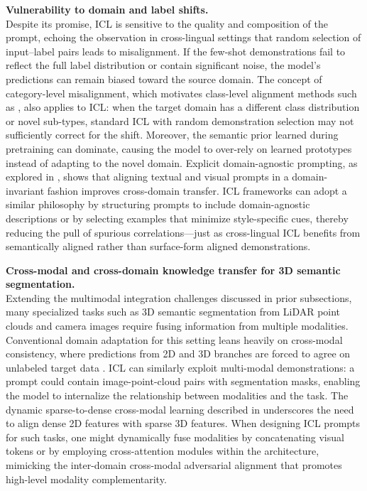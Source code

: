 \documentclass[11pt]{article}
\begin{document}
\textbf{Vulnerability to domain and label shifts.}\\
Despite its promise, ICL is sensitive to the quality and composition of the prompt, echoing the observation in cross-lingual settings that random selection of input--label pairs leads to misalignment. If the few-shot demonstrations fail to reflect the full label distribution or contain significant noise, the model's predictions can remain biased toward the source domain. The concept of category-level misalignment, which motivates class-level alignment methods such as \cite{ref138}, also applies to ICL: when the target domain has a different class distribution or novel sub-types, standard ICL with random demonstration selection may not sufficiently correct for the shift. Moreover, the semantic prior learned during pretraining can dominate, causing the model to over-rely on learned prototypes instead of adapting to the novel domain. Explicit domain-agnostic prompting, as explored in \cite{ref139}, shows that aligning textual and visual prompts in a domain-invariant fashion improves cross-domain transfer. ICL frameworks can adopt a similar philosophy by structuring prompts to include domain-agnostic descriptions or by selecting examples that minimize style-specific cues, thereby reducing the pull of spurious correlations---just as cross-lingual ICL benefits from semantically aligned rather than surface-form aligned demonstrations.

\textbf{Cross-modal and cross-domain knowledge transfer for 3D semantic segmentation.}\\
Extending the multimodal integration challenges discussed in prior subsections, many specialized tasks such as 3D semantic segmentation from LiDAR point clouds and camera images require fusing information from multiple modalities. Conventional domain adaptation for this setting leans heavily on cross-modal consistency, where predictions from 2D and 3D branches are forced to agree on unlabeled target data \cite{ref140}. ICL can similarly exploit multi-modal demonstrations: a prompt could contain image-point-cloud pairs with segmentation masks, enabling the model to internalize the relationship between modalities and the task. The dynamic sparse-to-dense cross-modal learning described in \cite{ref141} underscores the need to align dense 2D features with sparse 3D features. When designing ICL prompts for such tasks, one might dynamically fuse modalities by concatenating visual tokens or by employing cross-attention modules within the architecture, mimicking the inter-domain cross-modal adversarial alignment that promotes high-level modality complementarity.
\end{document}

